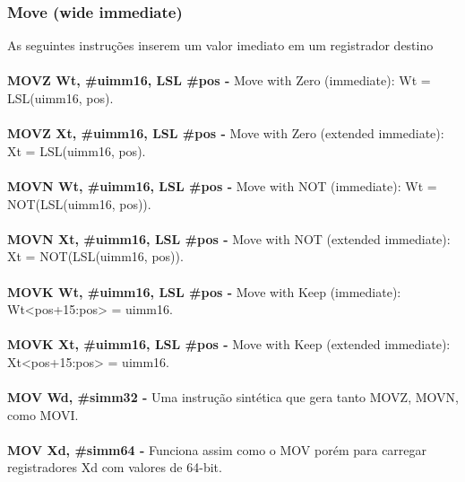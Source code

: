 \documentclass[12pt,a4paper,utf8]{ppgsi}
\begin{document}
\subsubsection{Move (wide immediate)}
As seguintes instruções inserem um valor imediato em um registrador destino
\\\\\textbf{MOVZ Wt, \#uimm16{, LSL \#pos} -} Move with Zero (immediate): Wt = LSL(uimm16, pos).
\\\\\textbf{MOVZ Xt, \#uimm16{, LSL \#pos} -} Move with Zero (extended immediate): Xt = LSL(uimm16, pos).
\\\\\textbf{MOVN Wt, \#uimm16{, LSL \#pos} -} Move with NOT (immediate): Wt = NOT(LSL(uimm16, pos)).
\\\\\textbf{MOVN Xt, \#uimm16{, LSL \#pos} -} Move with NOT (extended immediate): Xt = NOT(LSL(uimm16, pos)).
\\\\\textbf{MOVK Wt, \#uimm16{, LSL \#pos} -} Move with Keep (immediate): Wt<pos+15:pos> = uimm16.
\\\\\textbf{MOVK Xt, \#uimm16{, LSL \#pos} -} Move with Keep (extended immediate): Xt<pos+15:pos> = uimm16.
\\\\\textbf{MOV Wd, \#simm32 -} Uma instrução sintética que gera tanto MOVZ, MOVN, como MOVI. 
\\\\\textbf{MOV Xd, \#simm64 -} Funciona assim como o MOV porém para carregar registradores Xd com valores de 64-bit.
\end{document}

